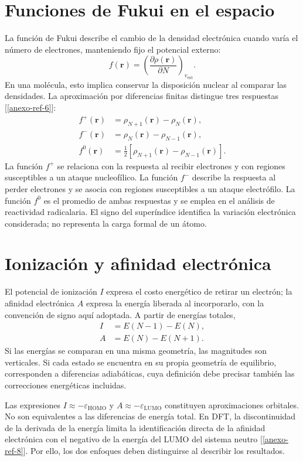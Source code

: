 \section{Funciones de Fukui en el espacio}
La función de Fukui describe el cambio de la densidad electrónica cuando varía el número de electrones, manteniendo fijo el potencial externo:
\begin{equation}
 f(\mathbf r)=\left(\frac{\partial\rho(\mathbf r)}{\partial N}\right)_{v_{\mathrm{ext}}}.
\end{equation}
En una molécula, esto implica conservar la disposición nuclear al comparar las densidades. La aproximación por diferencias finitas distingue tres respuestas [\ref{anexo-ref-6}]:
\begin{align}
 f^+(\mathbf r)&=\rho_{N+1}(\mathbf r)-\rho_N(\mathbf r),\\
 f^-(\mathbf r)&=\rho_N(\mathbf r)-\rho_{N-1}(\mathbf r),\\
 f^0(\mathbf r)&=\tfrac12\left[\rho_{N+1}(\mathbf r)-\rho_{N-1}(\mathbf r)\right].
\end{align}
La función $f^+$ se relaciona con la respuesta al recibir electrones y con regiones susceptibles a un ataque nucleofílico. La función $f^-$ describe la respuesta al perder electrones y se asocia con regiones susceptibles a un ataque electrófilo. La función $f^0$ es el promedio de ambas respuestas y se emplea en el análisis de reactividad radicalaria. El signo del superíndice identifica la variación electrónica considerada; no representa la carga formal de un átomo.

\section{Ionización y afinidad electrónica}
El potencial de ionización $I$ expresa el costo energético de retirar un electrón; la afinidad electrónica $A$ expresa la energía liberada al incorporarlo, con la convención de signo aquí adoptada. A partir de energías totales,
\begin{align}
 I&=E(N-1)-E(N),\\
 A&=E(N)-E(N+1).
\end{align}
Si las energías se comparan en una misma geometría, las magnitudes son verticales. Si cada estado se encuentra en su propia geometría de equilibrio, corresponden a diferencias adiabáticas, cuya definición debe precisar también las correcciones energéticas incluidas.

Las expresiones $I\approx-\varepsilon_{\mathrm{HOMO}}$ y $A\approx-\varepsilon_{\mathrm{LUMO}}$ constituyen aproximaciones orbitales. No son equivalentes a las diferencias de energía total. En DFT, la discontinuidad de la derivada de la energía limita la identificación directa de la afinidad electrónica con el negativo de la energía del LUMO del sistema neutro [\ref{anexo-ref-8}]. Por ello, los dos enfoques deben distinguirse al describir los resultados.

